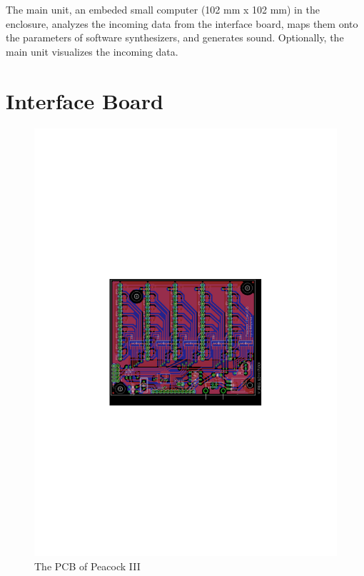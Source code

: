 \documentclass{nime-alternate}
\begin{document}
The main unit, an embeded small computer (102 mm x 102 mm) in the enclosure, analyzes the incoming data from the interface board, maps them onto the parameters of software synthesizers, and generates sound. Optionally, the main unit visualizes the incoming data.

\section{Interface Board} %

\begin{figure}[htbp]
       \begin{center}
              \includegraphics[width=1\columnwidth]{board}
       \end{center}
       \caption{The PCB of Peacock III}
       \label{fig:board}
\end{figure}
\end{document}
